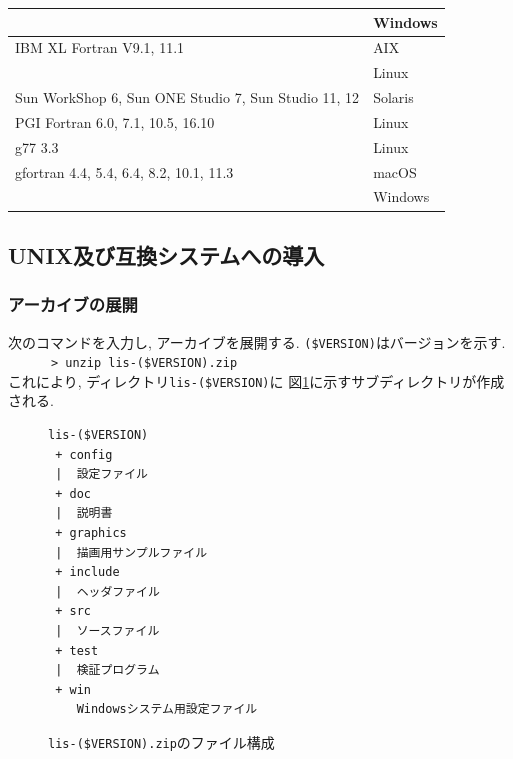 \documentclass[a4paper]{jarticle}
\begin{document}
\begin{table}[htbp]
\begin{center}
{\begin{tabular}{l|l}
                                                  & Windows  \\
\hline
IBM XL Fortran V9.1, 11.1                  & AIX     \\
                                           & Linux   \\
\hline
Sun WorkShop 6, Sun ONE Studio 7, Sun Studio 11, 12  & Solaris \\
\hline
PGI Fortran 6.0, 7.1, 10.5, 16.10          & Linux \\
\hline
g77 3.3                                    & Linux \\
gfortran 4.4, 5.4, 6.4, 8.2, 10.1, 11.3    & macOS \\
                                           & Windows \\
\hline
\end{tabular}
}
\end{center}
\end{table} 

\subsection{UNIX及び互換システムへの導入}
\subsubsection{アーカイブの展開}
次のコマンドを入力し, アーカイブを展開する. \verb|($VERSION)|はバージョンを示す. \\
\verb&      > unzip lis-($VERSION).zip &\\
これにより, ディレクトリ{\tt lis-(\$VERSION)}に
図\ref{listargz}に示すサブディレクトリが作成される. 

\begin{figure}[htbp]
\begin{center}
\begin{verbatim}
lis-($VERSION)
 + config
 |  設定ファイル
 + doc
 |  説明書
 + graphics
 |  描画用サンプルファイル
 + include
 |  ヘッダファイル
 + src
 |  ソースファイル
 + test
 |  検証プログラム
 + win
    Windowsシステム用設定ファイル
\end{verbatim}
\end{center}
\caption{{\tt lis-(\$VERSION).zip}のファイル構成}
\label{listargz}
\end{figure}
\end{document}
